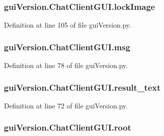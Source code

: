 \subsubsection[{lock\+Image}]{\setlength{\rightskip}{0pt plus 5cm}gui\+Version.\+Chat\+Client\+G\+U\+I.\+lock\+Image}\label{classgui_version_1_1_chat_client_g_u_i_af4e157319d9a46549b533d5718e8d114}


Definition at line 105 of file gui\+Version.\+py.

\hypertarget{classgui_version_1_1_chat_client_g_u_i_a44a52021282a7dc6c04aa10b77d829e9}{}
\subsubsection[{msg}]{\setlength{\rightskip}{0pt plus 5cm}gui\+Version.\+Chat\+Client\+G\+U\+I.\+msg}\label{classgui_version_1_1_chat_client_g_u_i_a44a52021282a7dc6c04aa10b77d829e9}


Definition at line 78 of file gui\+Version.\+py.

\hypertarget{classgui_version_1_1_chat_client_g_u_i_aed7ce16822dd2da856987bb7dbca00f7}{}
\subsubsection[{result\+\_\+text}]{\setlength{\rightskip}{0pt plus 5cm}gui\+Version.\+Chat\+Client\+G\+U\+I.\+result\+\_\+text}\label{classgui_version_1_1_chat_client_g_u_i_aed7ce16822dd2da856987bb7dbca00f7}


Definition at line 72 of file gui\+Version.\+py.

\hypertarget{classgui_version_1_1_chat_client_g_u_i_afec7497b20c1d133c5c026c9625a1691}{}
\subsubsection[{root}]{\setlength{\rightskip}{0pt plus 5cm}gui\+Version.\+Chat\+Client\+G\+U\+I.\+root}\label{classgui_version_1_1_chat_client_g_u_i_afec7497b20c1d133c5c026c9625a1691}


